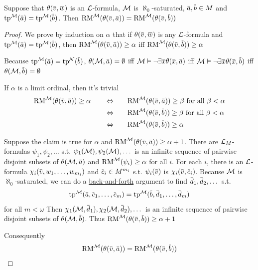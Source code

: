 \documentclass[11pt]{article}
\def \RM {\text{RM}}
\begin{document}
\begin{lemma}[]
\label{lemma6.2.2}
Suppose that \(\theta(\barv,\barw)\) is an \(\mathcal{L}\)-formula, \(\mathcal{M}\)
is \(\aleph_0\)-saturated, \(\bara,\barb\in M\) and \(\tp^{\calm}(\bara)=\tp^{\calm}(\barb)\).
Then \(\RM^{\calm}(\theta(\barv,\bara))=\RM^{\calm}(\theta(\barv,\barb))\)
\end{lemma}

\begin{proof}
We prove by induction on \(\alpha\) that if \(\theta(\barv,\barw)\) is any \(\mathcal{L}\)-formula
and \(\tp^{\calm}(\bara)=\tp^{\calm}(\barb)\), then \(\RM^{\calm}(\theta(\barv,\bara))\ge\alpha\)
iff \(\RM^{\calm}(\theta(\barv,\barb))\ge\alpha\)

Because \(\tp^{\calm}(\bara)=\tp^{\caln}(\barb)\), \(\theta(\calm,\bara)=\emptyset\) iff \(\calm\vDash\neg\exists\barx\theta(\barx,\bara)\)
iff \(\calm\vDash\neg\exists\barx\theta(\barx,\barb)\) iff \(\theta(\calm,\barb)=\emptyset\)

If \(\alpha\) is a limit ordinal, then it's trivial
\begin{alignat*}{3}
&\RM^{\calm}(\theta(\barv,\bara))\ge\alpha\quad&&\Leftrightarrow\quad&&\RM^{\calm}(\theta(\barv,\bara))\ge\beta\text{ for all }\beta<\alpha\\
&&&\Leftrightarrow&&\RM^{\calm}(\theta(\barv,\barb))\ge\beta\text{ for all }\beta<\alpha\\
&&&\Leftrightarrow&&\RM^{\calm}(\theta(\barv,\barb))\ge\alpha
\end{alignat*}

Suppose the claim is true for \(\alpha\) and \(\RM^{\calm}(\theta(\barv,\bara))\ge\alpha+1\). There
are \(\mathcal{L}_M\)-formulas \(\psi_1,\psi_2,\dots\) s.t. \(\psi_1(\mathcal{M}),\psi_2(\mathcal{M}),\dots\) is an infinite sequence of pairwise
disjoint subsets of \(\theta(\calm,\bara)\) and \(\RM^{\calm}(\psi_i)\ge\alpha\) for all \(i\). For each \(i\), there is
an \(\mathcal{L}\)-formula \(\chi_i(\barv,w_1,\dots,w_{m_i})\) and \(\barc_i\in M^{m_i}\) s.t. \(\psi_i(\barv)\)
is \(\chi_i(\barv,\barc_i)\). Because \(\mathcal{M}\) is \(\aleph_0\)-saturated, we can do a \uline{back-and-forth}
\label{Problem10}
argument to find \(\bard_1,\bard_2,\dots\) s.t.
\begin{equation*}
\tp^{\calm}(\bara,\barc_1,\dots,\barc_m)=\tp^{\calm}(\barb,\bard_1,\dots,\bard_m)
\end{equation*}
for all \(m<\omega\)
Then \(\chi_1(\calm,\bard_1),\chi_2(\calm,\bard_2),\dots\) is an infinite sequence of pairwise disjoint subsets
of \(\theta(\calm,\barb)\). Thus \(\RM^{\calm}(\theta(\barv,\barb))\ge\alpha+1\)

Consequently
\begin{equation*}
\RM^{\calm}(\theta(\barv,\bara))=\RM^{\calm}(\theta(\barv,\barb))
\end{equation*}
\end{proof}
\end{document}
